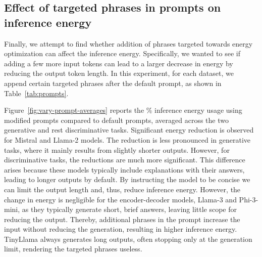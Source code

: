 
\subsection{Effect of targeted phrases in prompts on inference energy}
\label{sec:phrases}






Finally, we attempt to find whether addition of phrases targeted towards energy optimization can affect the inference energy. Specifically, we wanted to see if adding a few more input tokens can lead to a larger decrease in energy by reducing the output token length.
%
In this experiment, for each dataset, we append certain targeted phrases after the default prompt, as shown in Table~\ref{tab:prompts}.
%
%

Figure~\ref{fig:vary-prompt-averages} reports the \% inference energy usage using modified prompts compared to default prompts, averaged across the two generative and rest discriminative tasks. %
%
Significant energy reduction is observed for Mistral and Llama-2 models. %
The reduction is less pronounced in generative tasks, where it mainly results from slightly shorter outputs. However, for discriminative tasks, the reductions are much more significant. This difference arises because these models typically include explanations with their answers, leading to longer outputs by default. By instructing the model to be concise %
we can limit the output length and, thus, reduce inference energy.
However, the change in energy is negligible for the encoder-decoder models, Llama-3 and Phi-3-mini, as they typically generate short, brief answers, leaving little scope for reducing the output. Thereby, additional phrases in the prompt increase the input without reducing the generation, resulting in higher inference energy. 
TinyLlama always generates long outputs, often stopping only at the generation limit, rendering the targeted phrases useless.

%



